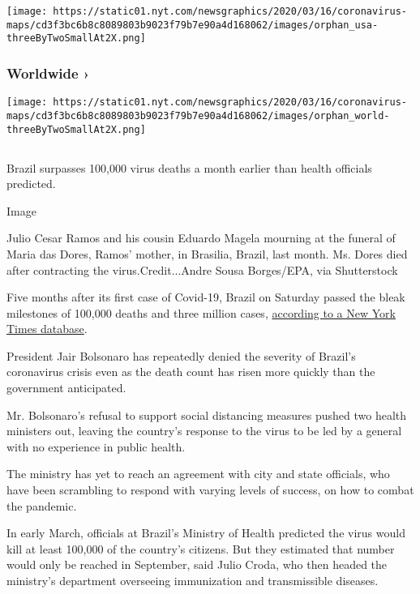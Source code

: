 \texttt{[image: https://static01.nyt.com/newsgraphics/2020/03/16/coronavirus-maps/cd3f3bc6b8c8089803b9023f79b7e90a4d168062/images/orphan\_usa-threeByTwoSmallAt2X.png]}
\href{https://www.nytimes.com/interactive/2020/world/coronavirus-maps.html}{}

\hypertarget{worldwide-}{%
\subsubsection{Worldwide ›}\label{worldwide-}}

\texttt{[image: https://static01.nyt.com/newsgraphics/2020/03/16/coronavirus-maps/cd3f3bc6b8c8089803b9023f79b7e90a4d168062/images/orphan\_world-threeByTwoSmallAt2X.png]}

\hypertarget{section-2}{%
\subsection{}\label{section-2}}

Brazil surpasses 100,000 virus deaths a month earlier than health
officials predicted.

Image

Julio Cesar Ramos and his cousin Eduardo Magela mourning at the funeral
of Maria das Dores, Ramos' mother, in Brasilia, Brazil, last month. Ms.
Dores died after contracting the virus.Credit...Andre Sousa Borges/EPA,
via Shutterstock

Five months after its first case of Covid-19, Brazil on Saturday passed
the bleak milestones of 100,000 deaths and three million cases,
\href{https://www.nytimes.com/interactive/2020/world/americas/brazil-coronavirus-cases.html}{according
to a New York Times database}.

President Jair Bolsonaro has repeatedly denied the severity of Brazil's
coronavirus crisis even as the death count has risen more quickly than
the government anticipated.

Mr. Bolsonaro's refusal to support social distancing measures pushed two
health ministers out, leaving the country's response to the virus to be
led by a general with no experience in public health.

The ministry has yet to reach an agreement with city and state
officials, who have been scrambling to respond with varying levels of
success, on how to combat the pandemic.

In early March, officials at Brazil's Ministry of Health predicted the
virus would kill at least 100,000 of the country's citizens. But they
estimated that number would only be reached in September, said Julio
Croda, who then headed the ministry's department overseeing immunization
and transmissible diseases.

